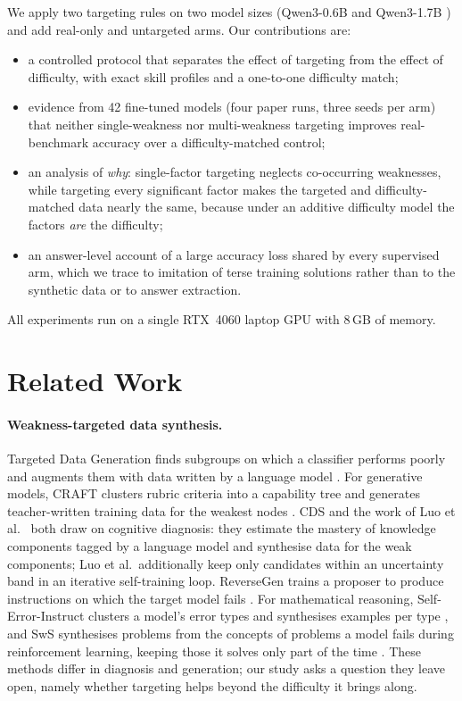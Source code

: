 \documentclass[11pt]{article}
\begin{document}
We apply two targeting rules on two model sizes (Qwen3-0.6B and Qwen3-1.7B \citep{qwen3}) and add real-only and
untargeted arms. Our contributions are:
\begin{itemize}
  \item a controlled protocol that separates the effect of targeting from the effect of difficulty, with exact skill
  profiles and a one-to-one difficulty match;
  \item evidence from 42 fine-tuned models (four paper runs, three seeds per arm) that neither single-weakness nor
  multi-weakness targeting improves real-benchmark accuracy over a difficulty-matched control;
  \item an analysis of \emph{why}: single-factor targeting neglects co-occurring weaknesses, while targeting every
  significant factor makes the targeted and difficulty-matched data nearly the same, because under an additive
  difficulty model the factors \emph{are} the difficulty;
  \item an answer-level account of a large accuracy loss shared by every supervised arm, which we trace to imitation of
  terse training solutions rather than to the synthetic data or to answer extraction.
\end{itemize}
All experiments run on a single RTX~4060 laptop GPU with 8\,GB of memory.

\section{Related Work}

\paragraph{Weakness-targeted data synthesis.}
Targeted Data Generation finds subgroups on which a classifier performs poorly and augments them with data written by
a language model \citep{he2023tdg}. For generative models, CRAFT clusters rubric criteria into a capability tree and
generates teacher-written training data for the weakest nodes \citep{gupta2026craft}. CDS \citep{zhao2025cds} and the
work of Luo et al.\ \citep{luo2026kite} both draw on cognitive diagnosis: they estimate the mastery of knowledge
components tagged by a language model and synthesise data for the weak components; Luo et al.\ additionally keep only
candidates within an uncertainty band in an iterative self-training loop. ReverseGen trains a proposer to produce
instructions on which the target model fails \citep{li2024reversegen}. For mathematical reasoning, Self-Error-Instruct
clusters a model's error types and synthesises examples per type \citep{yu2025selferror}, and SwS synthesises problems
from the concepts of problems a model fails during reinforcement learning, keeping those it solves only part of the time
\citep{liang2025sws}. These methods differ in diagnosis and generation; our study asks a question they leave open,
namely whether targeting helps beyond the difficulty it brings along.
\end{document}
